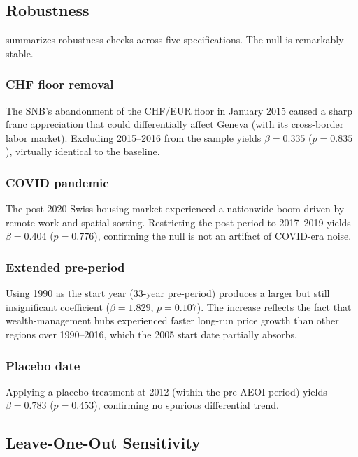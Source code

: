 \documentclass[12pt]{article}
\begin{document}


\subsection{Robustness}

 summarizes robustness checks across five specifications. The null is remarkably stable.

\subsubsection*{CHF floor removal} The SNB's abandonment of the CHF/EUR floor in January 2015 caused a sharp franc appreciation that could differentially affect Geneva (with its cross-border labor market). Excluding 2015--2016 from the sample yields $\beta = 0.335$ ($p = 0.835$), virtually identical to the baseline.

\subsubsection*{COVID pandemic} The post-2020 Swiss housing market experienced a nationwide boom driven by remote work and spatial sorting. Restricting the post-period to 2017--2019 yields $\beta = 0.404$ ($p = 0.776$), confirming the null is not an artifact of COVID-era noise.

\subsubsection*{Extended pre-period} Using 1990 as the start year (33-year pre-period) produces a larger but still insignificant coefficient ($\beta = 1.829$, $p = 0.107$). The increase reflects the fact that wealth-management hubs experienced faster long-run price growth than other regions over 1990--2016, which the 2005 start date partially absorbs.

\subsubsection*{Placebo date} Applying a placebo treatment at 2012 (within the pre-AEOI period) yields $\beta = 0.783$ ($p = 0.453$), confirming no spurious differential trend.



\subsection{Leave-One-Out Sensitivity}
\end{document}
